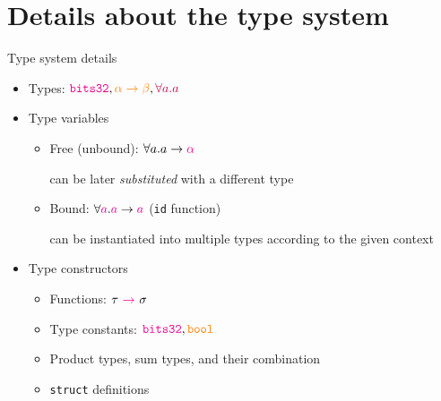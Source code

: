 \documentclass[aspectratio=169]{beamer}
\newcommand{\li}[1]{\lstinline{#1}}
\begin{document}
\section{Details about the type system}

\begin{frame}{Type system details}
  \begin{itemize}
     {
      \begin{itemize}
        \item Types: ${\color{magenta} \mathtt{bits32}}, {\color{orange} \alpha \to \beta}, {\color{purple} \forall a . a}$
        \vfill
        \item Type variables
        \begin{itemize}
          \item Free (unbound): $\forall a . a \to {\color{magenta} \alpha}$
          
          {\color{gray} can be later \emph{substituted} with a different type}
          \item Bound: $\forall {\color{magenta} a} . {\color{magenta} a} \to {\color{magenta} a}$ (\texttt{id} function)
          
          {\color{gray} can be instantiated into multiple types according to the given context}
        \end{itemize}
        \item Type constructors
        \begin{itemize}
          \item Functions: $\tau\ {\color{magenta} \to}\ \sigma$
          \item Type constants: ${\color{magenta} \mathtt{bits32}}, {\color{orange} \mathtt{bool}}$
          \item Product types, sum types, and their combination
          \item \li{struct} definitions
        \end{itemize}
      \end{itemize}
    }
\end{itemize}
\end{frame}
\end{document}
